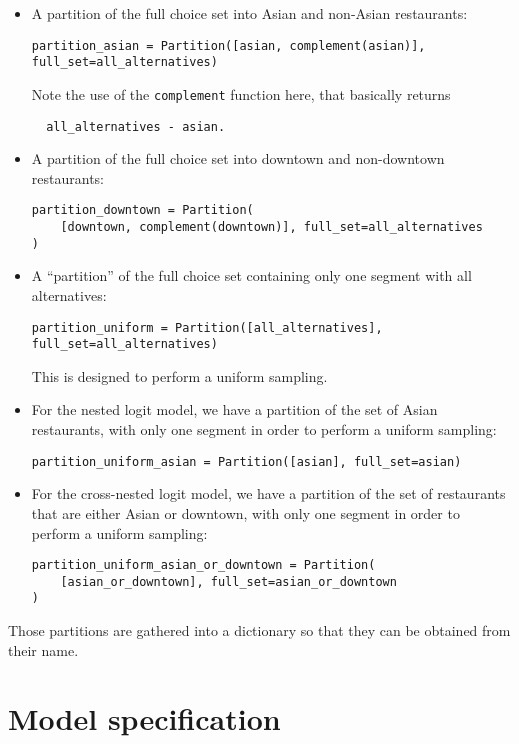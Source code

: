 \documentclass[12pt,a4paper]{article}
\begin{document}
\begin{itemize}
  \item A partition of the full choice set into Asian and non-Asian restaurants: 
\begin{lstlisting}
partition_asian = Partition([asian, complement(asian)], full_set=all_alternatives)
\end{lstlisting}
Note the use of the \lstinline+complement+ function here, that basically returns
\begin{lstlisting}
  all_alternatives - asian.
\end{lstlisting}

  \item A partition of the full choice set into downtown and non-downtown restaurants: 
\begin{lstlisting}
partition_downtown = Partition(
    [downtown, complement(downtown)], full_set=all_alternatives
)
\end{lstlisting}

  \item A ``partition'' of the full choice set containing only one segment with all alternatives:
\begin{lstlisting}
partition_uniform = Partition([all_alternatives], full_set=all_alternatives)
\end{lstlisting}
This is designed to perform a uniform sampling. 
\item For the nested logit model, we have a partition of the set of Asian restaurants, with only one segment in order to perform a uniform sampling:
\begin{lstlisting}
partition_uniform_asian = Partition([asian], full_set=asian)
\end{lstlisting}

\item For the cross-nested logit model, we have a partition of the set of restaurants that are either Asian or downtown, with only one segment in order to perform a uniform sampling:
\begin{lstlisting}
partition_uniform_asian_or_downtown = Partition(
    [asian_or_downtown], full_set=asian_or_downtown
)
\end{lstlisting}
\end{itemize}
Those partitions are gathered into a dictionary so that they can be obtained from their name.

\section{Model specification}
\end{document}
